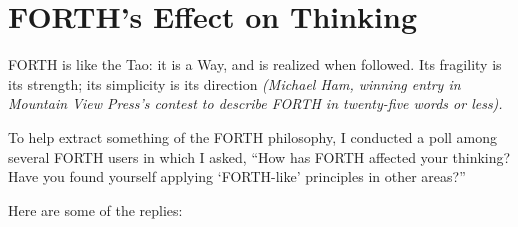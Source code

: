 \epilog{}
\chapter{
FORTH's Effect
on Thinking}
\begin{tfquot}
FORTH is like the Tao: it is a Way, and is realized when followed.  Its
fragility is its strength; its simplicity is its direction {\em (Michael Ham,
winning entry in Mountain View Press's contest to describe FORTH in twenty-five 
words or less).}
\end{tfquot}

To help extract something of the FORTH philosophy, I conducted a poll
among several FORTH users in which I asked, ``How has FORTH affected
your thinking?  Have you found yourself applying `FORTH-like' 
principles in other areas?''

Here are some of the replies:

